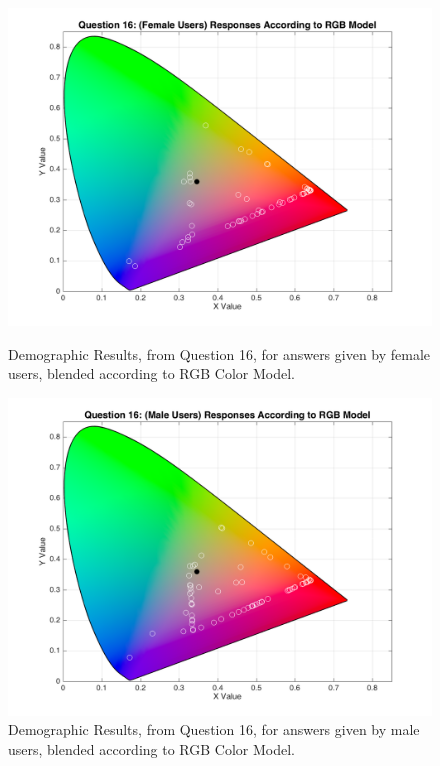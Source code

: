 \begin{figure}[!htbp]
  \centering
  \begin{minipage}{0.48\textwidth}
    \centering
    \includegraphics[width=\textwidth]{images/results/16_demo_genderF_RGBresponses.png}
    \caption[Demographic Results, from Question 16, for answers given by female users, blended according to RGB Color Model.]{Demographic Results, from Question 16, for answers given by female users, blended according to RGB Color Model.}
    \label{fig:gender_1}
  \end{minipage}\hfill
  \begin{minipage}{0.48\textwidth}
    \centering
    \includegraphics[width=\textwidth]{images/results/16_demo_genderM_RGBresponses.png}
    \caption[Demographic Results, from Question 16, for answers given by male users, blended according to RGB Color Model.]{Demographic Results, from Question 16, for answers given by male users, blended according to RGB Color Model.}
    \label{fig:gender_2}
  \end{minipage}
\end{figure}
%
